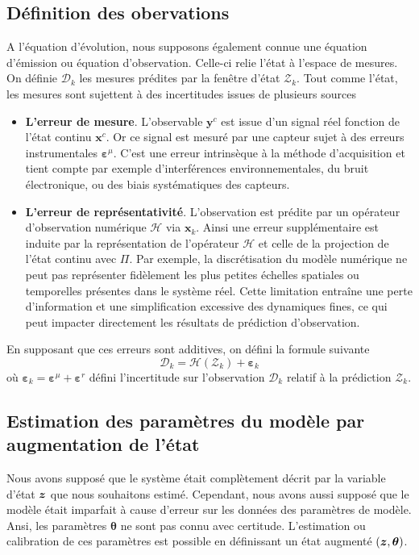 \subsection{Définition des obervations}
A l'équation d'évolution, nous supposons également connue une équation d'émission ou équation d'observation. Celle-ci relie l'état à l'espace de mesures. On définie $\mathcal{D}_k$ les mesures prédites par la fenêtre d'état $\mathcal{Z}_k$. Tout comme l'état, les mesures sont sujettent à des incertitudes issues de plusieurs sources

\begin{itemize}
    \item \textbf{L'erreur de mesure}. L'observable $\bm y^c$ est issue d'un signal réel fonction de l'état continu $\bm x^c$. Or ce signal est mesuré par une capteur sujet à des erreurs instrumentales $\bm \varepsilon^{\mu}$. C'est une erreur intrinsèque à la méthode d'acquisition et tient compte par exemple d'interférences environnementales, du bruit électronique, ou des biais systématiques des capteurs.
    \item \textbf{L'erreur de représentativité}. L'observation est prédite par un opérateur d'observation numérique $\mathcal H$ via $\bm x_k$. Ainsi une erreur supplémentaire est induite par la représentation de l'opérateur $\mathcal H$ et celle de la projection de l'état continu avec $\Pi$. Par exemple, la discrétisation du modèle numérique ne peut pas représenter fidèlement les plus petites échelles spatiales ou temporelles présentes dans le système réel. Cette limitation entraîne une perte d'information et une simplification excessive des dynamiques fines, ce qui peut impacter directement les résultats de prédiction d'observation.
\end{itemize}

En supposant que ces erreurs sont additives, on défini la formule suivante
\begin{equation*}
    \mathcal D_k = \mathcal H (\mathcal{Z}_k) + \bm{\varepsilon}_k
\end{equation*} où $\bm{\varepsilon}_k = \bm{\varepsilon}^\mu  + \bm{\varepsilon}^r$ défini l'incertitude sur l'observation $\mathcal D_k$ relatif à la prédiction $\mathcal{Z}_k$.

\subsection{Estimation des paramètres du modèle par augmentation de l'état}
Nous avons supposé que le système était complètement décrit par la variable d'état $\bm z$ que nous souhaitons estimé. Cependant, nous avons aussi supposé que le modèle était imparfait à cause d'erreur sur les données des paramètres de modèle. Ansi, les paramètres $\bm \theta$ ne sont pas connu avec certitude. L'estimation ou calibration de ces paramètres est possible en définissant un état augmenté $(\bm z, \bm \theta)$.

